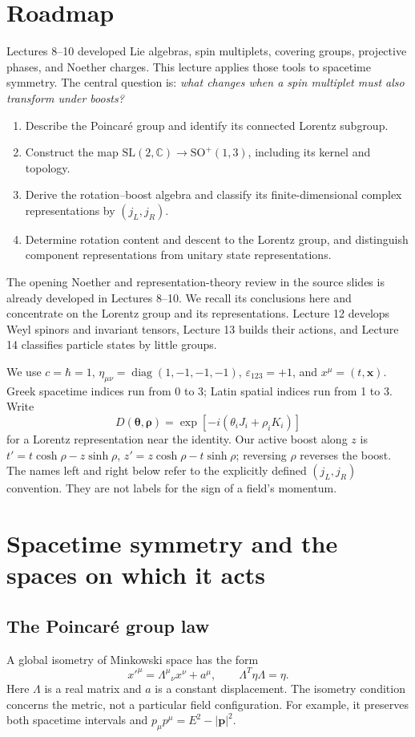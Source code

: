\documentclass[11pt]{article}
\newcommand{\SO}{\mathrm{SO}}
\newcommand{\C}{\mathbb C}
\newcommand{\SL}{\mathrm{SL}}
\newcommand{\Lor}{\SO^+(1,3)}
\newcommand{\eps}{\varepsilon}
\begin{document}
\section*{Roadmap}
Lectures 8--10 developed Lie algebras, spin multiplets, covering groups,
projective phases, and Noether charges. This lecture applies those tools
to spacetime symmetry. The central question is: \emph{what changes when
a spin multiplet must also transform under boosts?}
\begin{enumerate}
\item Describe the Poincar\'e group and identify its connected Lorentz subgroup.
\item Construct the map \(\SL(2,\C)\to\Lor\), including its kernel and topology.
\item Derive the rotation--boost algebra and classify its finite-dimensional
complex representations by \((j_L,j_R)\).
\item Determine rotation content and descent to the Lorentz group,
and distinguish component representations from unitary state representations.
\end{enumerate}
The opening Noether and representation-theory review in the source slides
is already developed in Lectures 8--10. We recall its conclusions here
and concentrate on the Lorentz group and its representations.
Lecture 12 develops Weyl spinors and invariant tensors, Lecture 13 builds
their actions, and Lecture 14 classifies particle states by little groups.

\begin{keyidea}[Conventions]
We use \(c=\hbar=1\), \(\eta_{\mu\nu}=\operatorname{diag}(1,-1,-1,-1)\),
\(\eps_{123}=+1\), and \(x^\mu=(t,\bm x)\). Greek spacetime indices run
from 0 to 3; Latin spatial indices run from 1 to 3. Write
\[
 D(\bm\theta,\bm\rho)=\exp[-i(\theta_iJ_i+\rho_iK_i)]
\]
for a Lorentz representation near the identity. Our active boost along
\(z\) is \(t'=t\cosh\rho-z\sinh\rho\),
\(z'=z\cosh\rho-t\sinh\rho\); reversing \(\rho\) reverses the boost.
The names left and right below refer to the explicitly defined
\((j_L,j_R)\) convention. They are not labels for the sign of a field's momentum.
\end{keyidea}

\section{Spacetime symmetry and the spaces on which it acts}
\subsection{The Poincar\'e group law}
A global isometry of Minkowski space has the form
\begin{equation}
 x'^\mu=\Lambda^\mu{}_{\nu}x^\nu+a^\mu,
 \qquad \Lambda^T\eta\Lambda=\eta.
 \label{eq:isometry}
\end{equation}
Here \(\Lambda\) is a real matrix and \(a\) is a constant displacement.
The isometry condition concerns the metric, not a particular field
configuration. For example, it preserves both spacetime intervals and
\(p_\mu p^\mu=E^2-|\bm p|^2\).
\end{document}
